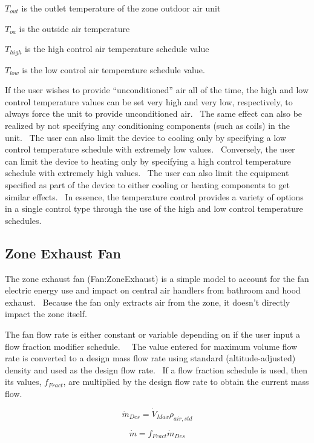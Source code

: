 \(T_{out}\) is the outlet temperature of the zone outdoor air unit

\(T_{oa}\) is the outside air temperature

\(T_{high}\) is the high control air temperature schedule value

\(T_{low}\) is the low control air temperature schedule value.

If the user wishes to provide ``unconditioned'' air all of the time, the high and low control temperature values can be set very high and very low, respectively, to always force the unit to provide unconditioned air.~ The same effect can also be realized by not specifying any conditioning components (such as coils) in the unit.~ The user can also limit the device to cooling only by specifying a low control temperature schedule with extremely low values.~ Conversely, the user can limit the device to heating only by specifying a high control temperature schedule with extremely high values.~ The user can also limit the equipment specified as part of the device to either cooling or heating components to get similar effects.~ In essence, the temperature control provides a variety of options in a single control type through the use of the high and low control temperature schedules.

\subsection{Zone Exhaust Fan}\label{zone-exhaust-fan}

The zone exhaust fan (Fan:ZoneExhaust) is a simple model to account for the fan electric energy use and impact on central air handlers from bathroom and hood exhaust.~ Because the fan only extracts air from the zone, it doesn't directly impact the zone itself.

The fan flow rate is either constant or variable depending on if the user input a flow fraction modifier schedule.~~ The value entered for maximum volume flow rate is converted to a design mass flow rate using standard (altitude-adjusted) density and used as the design flow rate.~ If a flow fraction schedule is used, then its values, \({f_{Fract}}\), are multiplied by the design flow rate to obtain the current mass flow.

\begin{equation}
{\dot m_{Des}} = {\dot V_{Max}}{\rho_{air,std}}
\end{equation}

\begin{equation}
\dot m = {f_{Fract}}{\dot m_{Des}}
\end{equation}

